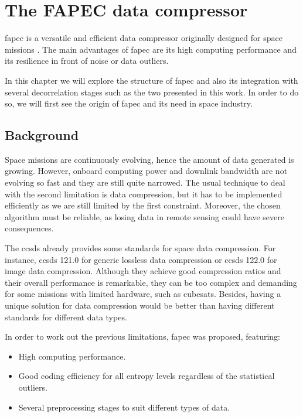 \chapter{The FAPEC data compressor} \label{ch:fapec}
\acrfull{fapec} is a versatile and efficient data compressor originally designed for space missions \parencite{PaperFAPEC}. The main advantages of \acrshort{fapec} are its high computing performance and its resilience in front of noise or data outliers.

In this chapter we will explore the structure of \acrshort{fapec} and also its integration with several decorrelation stages such as the two presented in this work. In order to do so, we will first see the origin of \acrshort{fapec} and its need in space industry.

\section{Background}
Space missions are continuously evolving, hence the amount of data generated is growing. However, onboard computing power and downlink bandwidth are not evolving so fast and they are still quite narrowed. The usual technique to deal with the second limitation is data compression, but it has to be implemented efficiently as we are still limited by the first constraint. Moreover, the chosen algorithm must be reliable, as losing data in remote sensing could have severe consequences.

The \acrfull{ccsds} already provides some standards for space data compression. For instance, \acrshort{ccsds} 121.0 for generic lossless data compression or \acrshort{ccsds} 122.0 \parencite{ccsds122} for image data compression. Although they achieve good compression ratios and their overall performance is remarkable, they can be too complex and demanding for some missions with limited hardware, such as cubesats. Besides, having a unique solution for data compression would be better than having different standards for different data types.

In order to work out the previous limitations, \acrshort{fapec} was proposed, featuring:
\begin{itemize}
	\item High computing performance.
	\item Good coding efficiency for all entropy levels regardless of the statistical outliers.
	\item Several preprocessing stages to suit different types of data.
\end{itemize}


